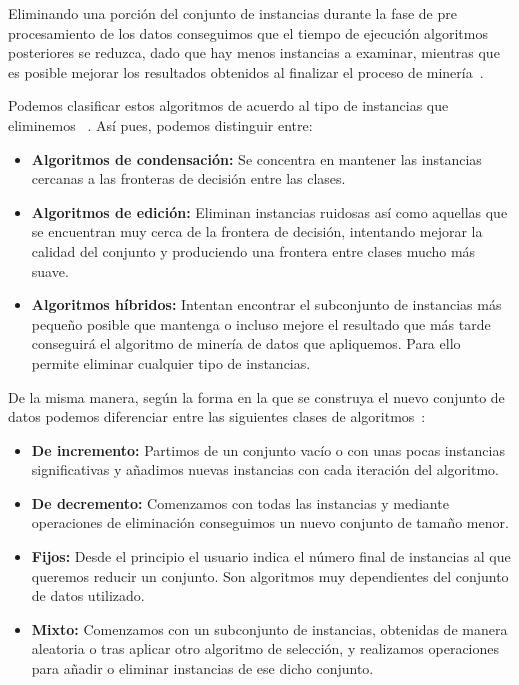 Eliminando una porción del conjunto de instancias durante la fase de pre procesamiento de los datos conseguimos que el tiempo de ejecución algoritmos posteriores se reduzca, dado que hay menos instancias a examinar, mientras que es posible mejorar los resultados obtenidos al finalizar el proceso de minería~\cite{IntroInstanceSelect}.

Podemos clasificar estos algoritmos de acuerdo al tipo de instancias que eliminemos ~\cite{Garcia2012}. Así pues, podemos distinguir entre:

\begin{itemize}
	\item \textbf{Algoritmos de condensación:} Se concentra en mantener las instancias cercanas a las fronteras de decisión entre las clases.
	\item \textbf{Algoritmos de edición:} Eliminan instancias ruidosas así como aquellas que se encuentran muy cerca de la frontera de decisión, intentando mejorar la calidad del conjunto y produciendo una frontera entre clases mucho más suave.
	\item \textbf{Algoritmos híbridos:} Intentan encontrar el subconjunto de instancias más pequeño posible que mantenga o incluso mejore el resultado que más tarde conseguirá el algoritmo de minería de datos que apliquemos. Para ello permite eliminar cualquier tipo de instancias. 
\end{itemize}

De la misma manera, según la forma en la que se construya el nuevo conjunto de datos podemos diferenciar entre las siguientes clases de algoritmos~\cite{Garcia2011}:

\begin{itemize}
	\item \textbf{De incremento:} Partimos de un conjunto vacío o con unas pocas instancias significativas y añadimos nuevas instancias con cada iteración del algoritmo.
	\item \textbf{De decremento:} Comenzamos con todas las instancias y mediante operaciones de eliminación conseguimos un nuevo conjunto de tamaño menor.
	\item \textbf{Fijos:} Desde el principio el usuario indica el número final de instancias al que queremos reducir un conjunto. Son algoritmos muy dependientes del conjunto de datos utilizado. 
	\item \textbf{Mixto:} Comenzamos con un subconjunto de instancias, obtenidas de manera aleatoria o tras aplicar otro algoritmo de selección, y realizamos operaciones para añadir o eliminar instancias de ese dicho conjunto.
\end{itemize}


